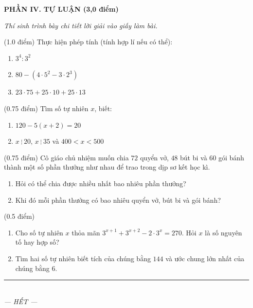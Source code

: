 \documentclass[12pt,a4paper]{article}
\begin{document}
\setcounter{ex}{0}
\noindent\textbf{\large PHẦN IV. TỰ LUẬN (3,0 điểm)}

\textit{Thí sinh trình bày chi tiết lời giải vào giấy làm bài.}

\vspace{1mm}
\begin{ex} (1.0 điểm)
Thực hiện phép tính (tính hợp lí nếu có thể):
\begin{enumerate}[label=\textbf{\alph*)}, leftmargin=0.8cm, itemsep=2pt]
\item $3^4 : 3^2$
\item $80 - (4 \cdot 5^2 - 3 \cdot 2^3)$
\item $23 \cdot 75 + 25 \cdot 10 + 25 \cdot 13$
\end{enumerate}
\end{ex}
\vspace{1.5mm}

\begin{ex} (0.75 điểm)
Tìm số tự nhiên $x$, biết:
\begin{enumerate}[label=\textbf{\alph*)}, leftmargin=0.8cm, itemsep=2pt]
\item $120 - 5(x + 2) = 20$
\item $x \ \vdots \ 20$, $x \ \vdots \ 35$ và $400 < x < 500$
\end{enumerate}
\end{ex}
\vspace{1.5mm}

\begin{ex} (0.75 điểm)
Cô giáo chủ nhiệm muốn chia $72$ quyển vở, $48$ bút bi và $60$ gói bánh thành một số phần thưởng như nhau để trao trong dịp sơ kết học kì.
\begin{enumerate}[label=\textbf{\alph*)}, leftmargin=0.8cm, itemsep=2pt]
\item Hỏi có thể chia được nhiều nhất bao nhiêu phần thưởng?
\item Khi đó mỗi phần thưởng có bao nhiêu quyển vở, bút bi và gói bánh?
\end{enumerate}
\end{ex}
\vspace{1.5mm}

\begin{ex} (0.5 điểm)
\begin{enumerate}[label=\textbf{\alph*)}, leftmargin=0.8cm, itemsep=2pt]
\item Cho số tự nhiên $x$ thỏa mãn $3^{x+1} + 3^{x+2} - 2 \cdot 3^x = 270$. Hỏi $x$ là số nguyên tố hay hợp số?
\item Tìm hai số tự nhiên biết tích của chúng bằng $144$ và ước chung lớn nhất của chúng bằng $6$.
\end{enumerate}
\end{ex}
\vspace{1.5mm}


\begin{center}
\rule{4cm}{0.4pt}\\
\textit{--- HẾT ---}
\end{center}
\end{document}
